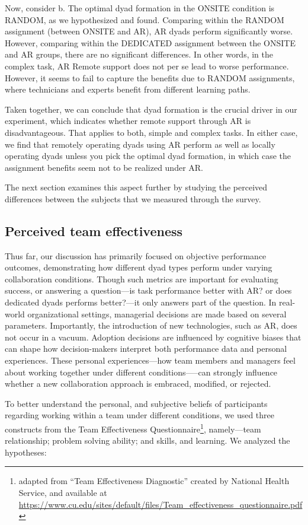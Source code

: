 \documentclass[msom,nonblindrev]{01 latex/class/informs3}
\begin{document}
Now, consider b. The optimal dyad formation in the ONSITE condition is RANDOM, as we hypothesized and found. Comparing within the RANDOM assignment (between ONSITE and AR), AR dyads perform significantly worse. However, comparing within the DEDICATED assignment between the ONSITE and AR groups, there are no significant differences. In other words, in the complex task, AR Remote support does not per se lead to worse performance. However, it seems to fail to capture the benefits due to RANDOM assignments, where technicians and experts benefit from different learning paths. 

Taken together, we can conclude that dyad formation is the crucial driver in our experiment, which indicates whether remote support through AR is disadvantageous. That applies to both, simple and complex tasks. In either case, we find that remotely operating dyads using AR perform as well as locally operating dyads unless you pick the optimal dyad formation, in which case the assignment benefits seem not to be realized under AR.

The next section examines this aspect further by studying the perceived differences between the subjects that we measured through the survey.

\subsection{Perceived team effectiveness}
Thus far, our discussion has primarily focused on objective performance outcomes, demonstrating how different dyad types perform under varying collaboration conditions. Though such metrics are important for evaluating success, or answering a question---is task performance better with AR? or does dedicated dyads performs better?---it only answers part of the question. In real-world organizational settings, managerial decisions are made based on several parameters. Importantly, the introduction of new technologies, such as AR, does not occur in a vacuum. Adoption decisions are influenced by cognitive biases that can shape how decision-makers interpret both performance data and personal experiences. These personal experiences---how team members and managers feel about working together under different conditions—--can strongly influence whether a new collaboration approach is embraced, modified, or rejected.

To better understand the personal, and subjective beliefs of participants regarding working within a team under different conditions, we used three constructs from the Team Effectiveness Questionnaire\footnote{adapted from ``Team Effectiveness Diagnostic'' created by National Health Service, and available at \url{https://www.cu.edu/sites/default/files/Team_effectiveness_questionnaire.pdf}}, namely---team relationship; problem solving ability; and skills, and learning. We analyzed the hypotheses:
\end{document}
